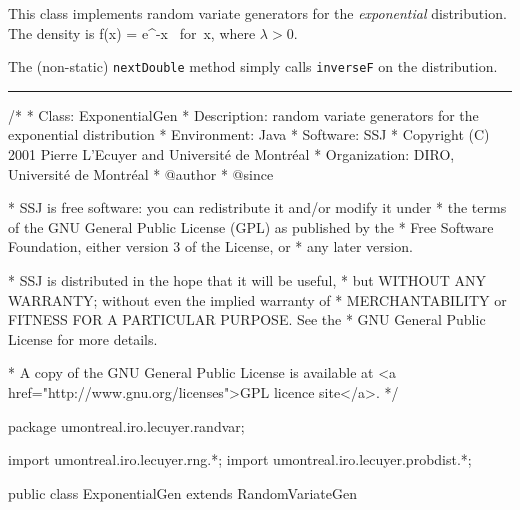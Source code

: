 
This class implements random variate generators for the 
{\em exponential\/} distribution. The density is
\eq
  f(x) = \lambda e^{-\lambda x} \qquad\mbox{ for }x,
\endeq
where $\lambda > 0$.

The (non-static) \texttt{nextDouble} method simply calls \texttt{inverseF} on the
distribution. 

\bigskip\hrule

\begin{code}
\begin{hide}
/*
 * Class:        ExponentialGen
 * Description:  random variate generators for the exponential distribution
 * Environment:  Java
 * Software:     SSJ 
 * Copyright (C) 2001  Pierre L'Ecuyer and Université de Montréal
 * Organization: DIRO, Université de Montréal
 * @author       
 * @since

 * SSJ is free software: you can redistribute it and/or modify it under
 * the terms of the GNU General Public License (GPL) as published by the
 * Free Software Foundation, either version 3 of the License, or
 * any later version.

 * SSJ is distributed in the hope that it will be useful,
 * but WITHOUT ANY WARRANTY; without even the implied warranty of
 * MERCHANTABILITY or FITNESS FOR A PARTICULAR PURPOSE.  See the
 * GNU General Public License for more details.

 * A copy of the GNU General Public License is available at
   <a href="http://www.gnu.org/licenses">GPL licence site</a>.
 */
\end{hide}
package umontreal.iro.lecuyer.randvar;\begin{hide}
import umontreal.iro.lecuyer.rng.*;
import umontreal.iro.lecuyer.probdist.*;
\end{hide}

public class ExponentialGen extends RandomVariateGen \begin{hide} {
   protected double lambda; 

\end{hide}\end{code}

